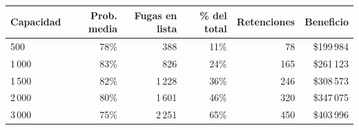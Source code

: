 \begin{tabular}{@{}lrrrrr@{}}
\toprule
\textbf{Capacidad} & \textbf{Prob. media} & \textbf{Fugas en lista} & \textbf{\% del total} & \textbf{Retenciones} & \textbf{Beneficio} \\
\midrule
500 & 78\% & 388 & 11\% & 78 & \$199\,984 \\
1\,000 & 83\% & 826 & 24\% & 165 & \$261\,123 \\
1\,500 & 82\% & 1\,228 & 36\% & 246 & \$308\,573 \\
2\,000 & 80\% & 1\,601 & 46\% & 320 & \$347\,075 \\
3\,000 & 75\% & 2\,251 & 65\% & 450 & \$403\,996 \\
\bottomrule
\end{tabular}